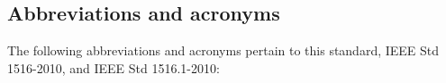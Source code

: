 



\newpage

\subsection{Abbreviations and acronyms}
The following abbreviations and acronyms pertain to this standard, IEEE Std 1516-2010, and IEEE Std 1516.1-2010:

\begingroup
\fontsize{10.0}{12.0}\selectfont
\setlength{\tabcolsep}{0pt}
\renewcommand{\arraystretch}{1.25}
